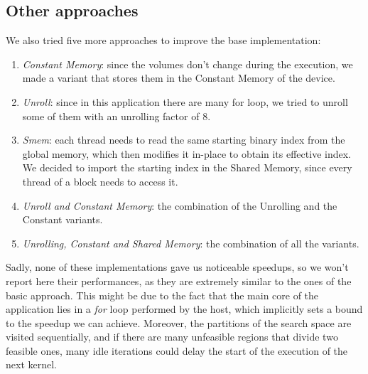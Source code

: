 \documentclass[12pt]{extarticle}
\begin{document}
\subsection{Other approaches}
We also tried five more approaches to improve the base implementation:
\begin{enumerate}
    \item \emph{Constant Memory}: since the volumes don't change during the execution, we made a variant that stores them in the Constant Memory of the device.
    \item \emph{Unroll}: since in this application there are many for loop, we tried to unroll some of them with an unrolling factor of 8.
    \item \emph{Smem}: each thread needs to read the same starting binary index from the global memory, which then modifies it in-place to obtain its effective index. We decided to import the starting index in the Shared Memory, since every thread of a block needs to access it.
    \item \emph{Unroll and Constant Memory}: the combination of the Unrolling and the Constant variants.
    \item \emph{Unrolling, Constant and Shared Memory}: the combination of all the variants.
\end{enumerate}
Sadly, none of these implementations gave us noticeable speedups, so we won't report here their performances, as they are extremely similar to the ones of the basic approach. This might be due to the fact that the main core of the application lies in a \emph{for} loop performed by the host, which implicitly sets a bound to the speedup we can achieve. Moreover, the partitions of the search space are visited sequentially, and if there are many unfeasible regions that divide two feasible ones, many idle iterations could delay the start of the execution of the next kernel. 
\end{document}
